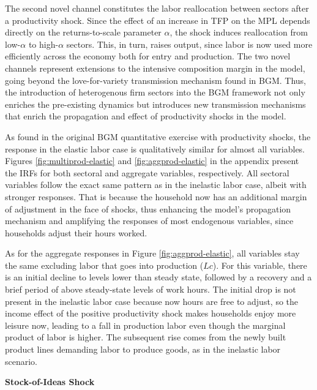 \documentclass[a4paper,12pt]{article} %
\numberwithin{equation}{section} %
\numberwithin{figure}{section}
\numberwithin{table}{section}
\begin{document}
The second novel channel constitutes the labor reallocation between sectors after a productivity shock. Since the effect of an increase in
TFP on the MPL depends directly on the returns-to-scale parameter $\alpha$, the shock induces 
reallocation from low-$\alpha$ to high-$\alpha$ sectors. This, in turn, raises output, since labor is now used more efficiently across 
the economy both for entry and production. The two novel channels represent extensions to the intensive composition margin in the model, 
going beyond the love-for-variety transmission mechanism found in BGM. Thus, the introduction
of heterogenous firm sectors into the BGM framework not only enriches the pre-existing dynamics but introduces new transmission mechanisms
that enrich the propagation and effect of productivity shocks in the model.

As found in the original BGM quantitative exercise with productivity shocks, the response in the elastic labor case is 
qualitatively similar for almost all variables. Figures \ref{fig:multiprod-elastic} and \ref{fig:aggprod-elastic} in the appendix present the IRFs for both
sectoral and aggregate variables, respectively. All sectoral variables follow the exact same pattern as in the inelastic labor case, albeit 
with stronger responses. That is because the household now has an additional margin of adjustment in the face of shocks, thus enhancing the model's 
propagation mechanism and amplifying the responses of most endogenous variables, since households adjust their hours worked. 

As for the aggregate
responses in Figure \ref{fig:aggprod-elastic}, all variables stay the same excluding labor that goes into production ($Lc$). For this variable, there
is an initial decline to levels lower than steady state, followed by a recovery and a brief period of above steady-state levels of work hours. 
The initial drop is not present in the inelastic labor case because now hours are free to adjust, so the income effect of the positive 
productivity shock makes households enjoy more leisure now, leading to a fall in production labor even though the marginal product of 
labor is higher. The subsequent rise comes from  the newly built product lines demanding labor to produce goods, as in the 
inelastic labor scenario.



\medskip
\medskip
\noindent\textbf{Stock-of-Ideas Shock}
\medskip
\end{document}
